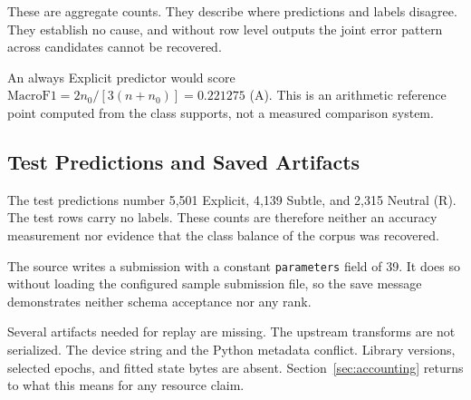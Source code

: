 \documentclass[runningheads]{llncs}
\begin{document}
These are aggregate counts. They describe where predictions and labels disagree. They establish no cause, and without row level outputs the joint error pattern across candidates cannot be recovered.

An always Explicit predictor would score $\mathrm{MacroF1} = 2n_0 / [3(n + n_0)] = 0.221275$ (A). This is an arithmetic reference point computed from the class supports, not a measured comparison system.

\subsection{Test Predictions and Saved Artifacts}

The test predictions number 5,501 Explicit, 4,139 Subtle, and 2,315 Neutral (R). The test rows carry no labels. These counts are therefore neither an accuracy measurement nor evidence that the class balance of the corpus was recovered.

The source writes a submission with a constant \texttt{parameters} field of 39. It does so without loading the configured sample submission file, so the save message demonstrates neither schema acceptance nor any rank.

Several artifacts needed for replay are missing. The upstream transforms are not serialized. The device string and the Python metadata conflict. Library versions, selected epochs, and fitted state bytes are absent. Section~\ref{sec:accounting} returns to what this means for any resource claim.



\end{document}
